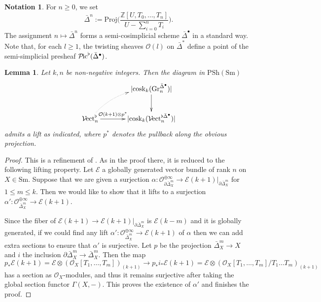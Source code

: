 \documentclass{amsart}
\theoremstyle{plain}
\newtheorem{lemma}[theorem]{Lemma}
\theoremstyle{definition}
\newtheorem{notation}[theorem]{Notation}
\theoremstyle{remark}
\numberwithin{equation}{theorem}
\newcommand{\mcal}[1]{\mathcal{#1}}
\newcommand{\mbb}[1]{\mathbb{#1}}
\newcommand{\Gr}{\mathrm{Gr}}
\newcommand{\Proj}{\mathrm{Proj}}
\newcommand{\PSh}{\mathrm{PSh}}
\newcommand{\Sm}{\mathrm{Sm}}
\newcommand{\Pic}{{\mathcal{P}\mspace{-2.0mu}\mathrm{ic}}}
\newcommand{\Vect}{{\mathcal{V}\mspace{-2.0mu}\mathrm{ect}}}
\newcommand{\cosk}{\operatorname{cosk}}
\begin{document}
\begin{notation}
For $n\ge 0$, we set
\[
	\bar{\Delta}^n := \Proj\biggl(\frac{\mbb{Z}[U,T_0,\dotsc,T_n]}{U-\sum_{i=0}^nT_i}\biggr).
\]
The assignment $n\mapsto\bar{\Delta}^n$ forms a semi-cosimplicial scheme $\bar{\Delta}^\bullet$ in a standard way.
Note that, for each $l\ge 1$, the twisting sheaves $\mcal{O}(l)$ on $\bar{\Delta}^*$ define a point of the semi-simplicial presheaf $\Pic^\flat(\bar{\Delta}^\bullet)$.
\end{notation}

\begin{lemma}\label{lem:Lif}
Let $k,n$ be non-negative integers.
Then the diagram in $\PSh(\Sm)$
\[
\xymatrix@C+1pc{
	& \lvert \cosk_k(\Gr_n^{\bar{\Delta}^\bullet}) \rvert \ar[d] \\
	\Vect_n^\flat \ar[r]^-{\mcal{O}(k+1)\otimes p^*} \ar@{.>}@/^1pc/[ru] & \lvert \cosk_k(\Vect_n^{\flat\bar{\Delta}^\bullet}) \rvert
}
\]
admits a lift as indicated, where $p^*$ denotes the pullback along the obvious projection.
\end{lemma}
\begin{proof}
This is a refinement of \cite[Lemma 3.3 (A)]{AI}.
As in the proof there, it is reduced to the following lifting property.
Let $\mcal{E}$ a globally generated vector bundle of rank $n$ on $X\in\Sm$.
Suppose that we are given a surjection $\alpha\colon\mcal{O}^{\oplus\infty}_{\partial\bar{\Delta}^m_X}\to\mcal{E}(k+1)\vert_{\partial\bar{\Delta}^m_X}$ for $1\le m\le k$.
Then we would like to show that it lifts to a surjection $\alpha'\colon\mcal{O}^{\oplus\infty}_{\bar{\Delta}^m_X}\to\mcal{E}(k+1)$.

Since the fiber of $\mcal{E}(k+1)\to\mcal{E}(k+1)\vert_{\partial\bar{\Delta}^m_X}$ is $\mcal{E}(k-m)$ and it is globally generated, if we could find any lift $\alpha'\colon\mcal{O}^{\oplus\infty}_{\bar{\Delta}^m_X}\to\mcal{E}(k+1)$ of $\alpha$ then we can add extra sections to ensure that $\alpha'$ is surjective.
Let $p$ be the projection $\bar{\Delta}^m_X\to X$ and $i$ the inclusion $\partial\bar{\Delta}^m_X\to\bar{\Delta}^m_X$.
Then the map
\[
	p_*\mcal{E}(k+1) = \mcal{E}\otimes(\mcal{O}_X[T_1,\dotsc,T_m])_{(k+1)} \to
	p_*i_*\mcal{E}(k+1) = \mcal{E}\otimes(\mcal{O}_X[T_1,\dotsc,T_m]/T_1\dotsc T_m)_{(k+1)}
\]
has a section as $\mcal{O}_X$-modules, and thus it remains surjective after taking the global section functor $\Gamma(X,-)$.
This proves the existence of $\alpha'$ and finishes the proof.
\end{proof}
\end{document}
